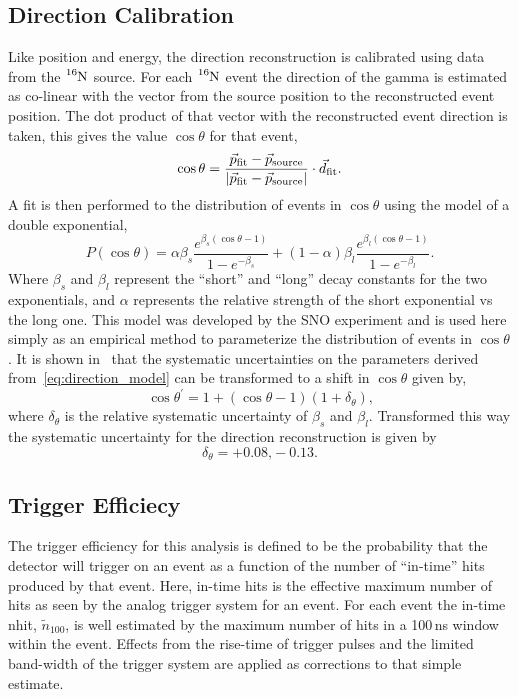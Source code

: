 \subsection{Direction Calibration}
Like position and energy, the direction reconstruction is calibrated using data
from the $\ce{^{16}N}$ source. For each $\ce{^{16}N}$ event the direction
of the gamma is estimated as co-linear with the vector from the source
position to the reconstructed event position. The dot product of that vector
with the reconstructed event direction is taken, this gives the value $\cos\theta$
for that event,
\begin{equation}
    \cos\theta = \frac{\vec{p}_{\mathrm{fit}} - \vec{p}_{\mathrm{source}}}
                {\abs{\vec{p}_{\mathrm{fit}} - \vec{p}_{\mathrm{source}}}} \cdot \vec{d}_{\mathrm{fit}}\text{.}
\end{equation}
A fit is then performed to the distribution of events in $\cos\theta$ using
the model of a double exponential,
\begin{equation}
    P(\cos\theta) = \alpha\beta_{s}\frac{e^{\beta_{s}(\cos\theta -1)}}{1-e^{-\beta_{s}}} +
                    (1-\alpha)\beta_{l}\frac{e^{\beta_{l}(\cos\theta - 1)}}{1-e^{-\beta_{l}}}\text{.}
    \label{eq:direction_model}
\end{equation}
Where $\beta_{s}$ and $\beta_{l}$ represent the ``short'' and ``long'' decay constants
for the two exponentials, and $\alpha$ represents the relative
strength of the short exponential vs the long one.
This model was developed by the SNO experiment and is used here simply as an empirical
method to parameterize the distribution of events in $\cos\theta$.
It is shown in~\cite{pierre_luc_thesis} that the systematic uncertainties on the
parameters derived from~\eqref{eq:direction_model} can be transformed to a shift
in $\cos\theta$ given by,
\begin{equation}
    \cos\theta^{\prime} = 1+(\cos\theta-1)(1+\delta_{\theta})\text{,}
\end{equation}
where $\delta_{\theta}$ is the relative systematic uncertainty of $\beta_{s}$ and $\beta_{l}$.
Transformed this way the systematic uncertainty for the direction reconstruction
is given by
\begin{equation*}
    \delta_{\theta} = +0.08\text{,} -0.13\text{.}
\end{equation*}

\subsection{Trigger Efficiecy}
The trigger efficiency for this analysis is defined to be the probability that
the detector will trigger on an event as a function of the number of ``in-time''
hits produced by that event.
Here, in-time hits is the effective maximum number of hits as seen by the analog
trigger system for an event.
For each event the in-time nhit, $\tilde{n}_{100}$, is well
estimated by the maximum number of hits in a 100\,ns window within the event.
Effects from the rise-time of trigger pulses and the limited band-width of the
trigger system are applied as corrections to that simple estimate.

